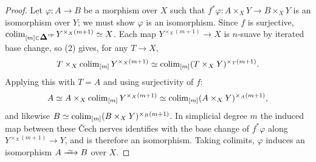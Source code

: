 \documentclass[11pt]{book}
\begin{document}
	\begin{proof}
		Let $\varphi\colon A \to B$ be a morphism over $X$ such that $f^*\varphi\colon A \times_X Y \to B \times_X Y$ is an isomorphism over $Y$; we must show $\varphi$ is an isomorphism. Since $f$ is surjective, $\colim_{[m] \in \simp\catop} Y^{\times_X(m+1)} \simeq X$. Each map $Y^{\times_X(m+1)} \to X$ is $n$-suave by iterated base change, so (2) gives, for any $T \to X$,
		\[
			T \times_X \operatorname{colim}_{[m]} Y^{\times_X(m+1)} \simeq \operatorname{colim}_{[m]} (T \times_X Y)^{\times_T(m+1)}.
		\]
		Applying this with $T = A$ and using surjectivity of $f$:
		\[
			A \simeq A \times_X \operatorname{colim}_{[m]} Y^{\times_X(m+1)} \simeq \operatorname{colim}_{[m]} (A \times_X Y)^{\times_A(m+1)},
		\]
		and likewise $B \simeq \operatorname{colim}_{[m]} (B \times_X Y)^{\times_B(m+1)}$. In simplicial degree $m$ the induced map between these Čech nerves identifies with the base change of $f^*\varphi$ along $Y^{\times_X(m+1)} \to Y$, and is therefore an isomorphism. Taking colimits, $\varphi$ induces an isomorphism $A \iso B$ over $X$.
	\end{proof}
\end{document}

